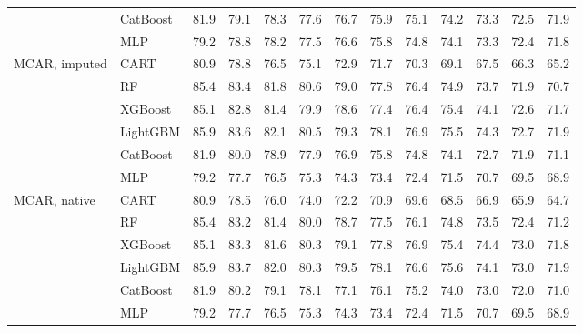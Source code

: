 \documentclass[pdflatex,sn-mathphys]{sn-jnl}
\theoremstyle{thmstyleone}
\begin{document}
\begin{table}[htbp]
\begin{tabular}{@{}llrrrrrrrrrrr@{}}
 & CatBoost & 81.9 & 79.1 & 78.3 & 77.6 & 76.7 & 75.9 & 75.1 & 74.2 & 73.3 & 72.5 & 71.9 \\
 & MLP & 79.2 & 78.8 & 78.2 & 77.5 & 76.6 & 75.8 & 74.8 & 74.1 & 73.3 & 72.4 & 71.8 \\
\midrule
MCAR, imputed & CART & 80.9 & 78.8 & 76.5 & 75.1 & 72.9 & 71.7 & 70.3 & 69.1 & 67.5 & 66.3 & 65.2 \\
 & RF & 85.4 & 83.4 & 81.8 & 80.6 & 79.0 & 77.8 & 76.4 & 74.9 & 73.7 & 71.9 & 70.7 \\
 & XGBoost & 85.1 & 82.8 & 81.4 & 79.9 & 78.6 & 77.4 & 76.4 & 75.4 & 74.1 & 72.6 & 71.7 \\
 & LightGBM & 85.9 & 83.6 & 82.1 & 80.5 & 79.3 & 78.1 & 76.9 & 75.5 & 74.3 & 72.7 & 71.9 \\
 & CatBoost & 81.9 & 80.0 & 78.9 & 77.9 & 76.9 & 75.8 & 74.8 & 74.1 & 72.7 & 71.9 & 71.1 \\
 & MLP & 79.2 & 77.7 & 76.5 & 75.3 & 74.3 & 73.4 & 72.4 & 71.5 & 70.7 & 69.5 & 68.9 \\
\midrule
MCAR, native & CART & 80.9 & 78.5 & 76.0 & 74.0 & 72.2 & 70.9 & 69.6 & 68.5 & 66.9 & 65.9 & 64.7 \\
 & RF & 85.4 & 83.2 & 81.4 & 80.0 & 78.7 & 77.5 & 76.1 & 74.8 & 73.5 & 72.4 & 71.2 \\
 & XGBoost & 85.1 & 83.3 & 81.6 & 80.3 & 79.1 & 77.8 & 76.9 & 75.4 & 74.4 & 73.0 & 71.8 \\
 & LightGBM & 85.9 & 83.7 & 82.0 & 80.3 & 79.5 & 78.1 & 76.6 & 75.6 & 74.1 & 73.0 & 71.9 \\
 & CatBoost & 81.9 & 80.2 & 79.1 & 78.1 & 77.1 & 76.1 & 75.2 & 74.0 & 73.0 & 72.0 & 71.0 \\
 & MLP & 79.2 & 77.7 & 76.5 & 75.3 & 74.3 & 73.4 & 72.4 & 71.5 & 70.7 & 69.5 & 68.9 \\
\bottomrule
\end{tabular}
\end{table}
\end{document}
